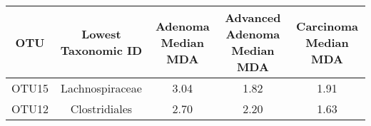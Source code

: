 \documentclass[12pt,]{article}
\begin{document}
\begin{longtable}[]{@{}ccccc@{}}
\toprule
\begin{minipage}[b]{0.07\columnwidth}\centering\strut
OTU\strut
\end{minipage} & \begin{minipage}[b]{0.18\columnwidth}\centering\strut
Lowest Taxonomic ID\strut
\end{minipage} & \begin{minipage}[b]{0.17\columnwidth}\centering\strut
Adenoma Median MDA\strut
\end{minipage} & \begin{minipage}[b]{0.25\columnwidth}\centering\strut
Advanced Adenoma Median MDA\strut
\end{minipage} & \begin{minipage}[b]{0.19\columnwidth}\centering\strut
Carcinoma Median MDA\strut
\end{minipage}\tabularnewline
\midrule
\endhead
\begin{minipage}[t]{0.07\columnwidth}\centering\strut
OTU15\strut
\end{minipage} & \begin{minipage}[t]{0.18\columnwidth}\centering\strut
Lachnospiraceae\strut
\end{minipage} & \begin{minipage}[t]{0.17\columnwidth}\centering\strut
3.04\strut
\end{minipage} & \begin{minipage}[t]{0.25\columnwidth}\centering\strut
1.82\strut
\end{minipage} & \begin{minipage}[t]{0.19\columnwidth}\centering\strut
1.91\strut
\end{minipage}\tabularnewline
\begin{minipage}[t]{0.07\columnwidth}\centering\strut
OTU12\strut
\end{minipage} & \begin{minipage}[t]{0.18\columnwidth}\centering\strut
Clostridiales\strut
\end{minipage} & \begin{minipage}[t]{0.17\columnwidth}\centering\strut
2.70\strut
\end{minipage} & \begin{minipage}[t]{0.25\columnwidth}\centering\strut
2.20\strut
\end{minipage} & \begin{minipage}[t]{0.19\columnwidth}\centering\strut
1.63\strut
\end{minipage}\tabularnewline

\end{longtable}
\end{document}
